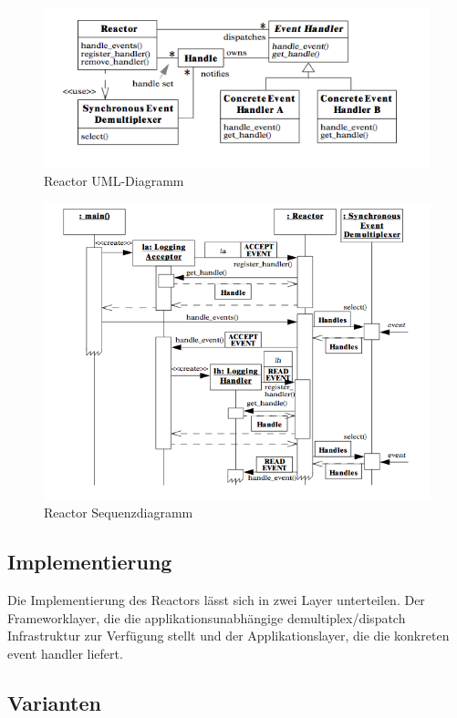 \begin{figure}[H]
	\centering
	\includegraphics[width=12cm]{content/posa2/reactor/images/uml-diagram.png}
	\caption{Reactor UML-Diagramm}
\end{figure}



\begin{figure}[H]
	\centering
	\includegraphics[width=12cm]{content/posa2/reactor/images/ssd.png}
	\caption{Reactor Sequenzdiagramm}
\end{figure}


\subsection*{Implementierung}

Die Implementierung des Reactors lässt sich in zwei Layer unterteilen. Der Frameworklayer, die die applikationsunabhängige demultiplex/dispatch Infrastruktur zur Verfügung stellt und der Applikationslayer, die die konkreten event handler liefert.


\subsection*{Varianten}

